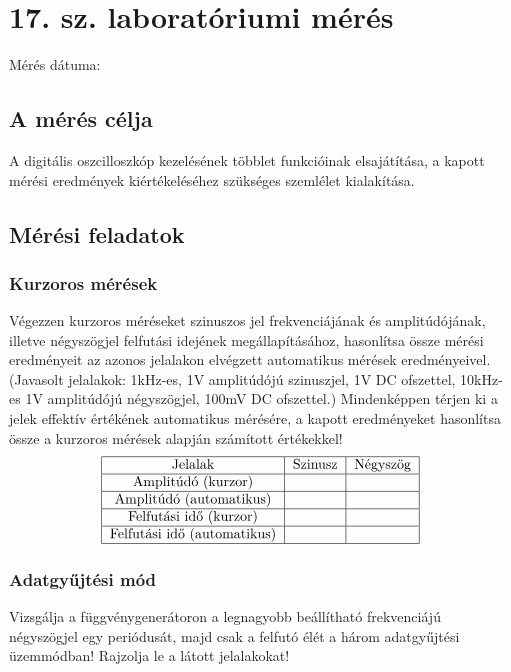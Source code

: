 \documentclass[10pt,a4paper]{article}
\begin{document}
\section{17. sz. laboratóriumi mérés}
Mérés dátuma: \date{2017.10.09}
	\subsection{A mérés célja}
	A digitális oszcilloszkóp kezelésének többlet funkcióinak
elsajátítása, a kapott mérési eredmények kiértékeléséhez
szükséges szemlélet kialakítása.
	\subsection{Mérési feladatok}
	\subsubsection{Kurzoros mérések}
	Végezzen kurzoros méréseket szinuszos jel frekvenciájának
és amplitúdójának, illetve négyszögjel felfutási idejének
megállapításához, hasonlítsa össze mérési eredményeit az
azonos jelalakon elvégzett automatikus mérések
eredményeivel. (Javasolt jelalakok: 1kHz-es, 1V amplitúdójú
szinuszjel, 1V DC ofszettel, 10kHz-es 1V amplitúdójú
négyszögjel, 100mV DC ofszettel.) Mindenképpen térjen ki a
jelek effektív értékének automatikus mérésére, a kapott
eredményeket hasonlítsa össze a kurzoros mérések alapján
számított értékekkel!$$\begin{tabular}{|c|c|c|}
\hline 
Jelalak & Szinusz & Négyszög \\ 
\hline 
 Amplitúdó (kurzor) &  &  \\ 
\hline 
Amplitúdó (automatikus) &  &  \\ 
\hline 
 Felfutási idő (kurzor) & &  \\ 
\hline 
Felfutási idő (automatikus) &  &  \\ 
\hline 
\end{tabular} $$ 
 \subsubsection{Adatgyűjtési mód}
 	Vizsgálja a függvénygenerátoron a legnagyobb beállítható
frekvenciájú négyszögjel egy periódusát, majd csak a felfutó
élét a három adatgyűjtési üzemmódban! Rajzolja le a látott
jelalakokat!\newpage
\end{document}
